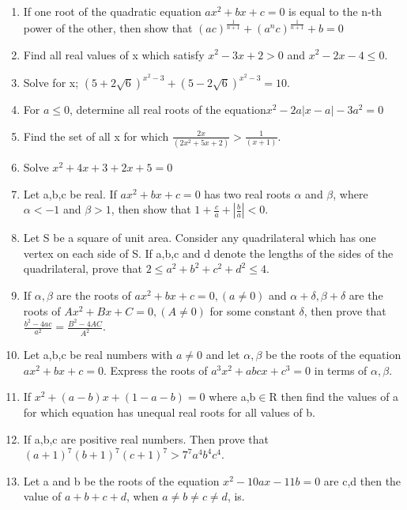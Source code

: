 \documentclass[journal,12pt,twocolumn]{IEEEtran}
\begin{document}
\begin{enumerate}[label=\arabic*]
\item If one root of the quadratic equation $ax^2+bx+c=0$ is equal to the n-th power of the other, then show that $(ac)^{\frac{1}{n+1}}+(a^nc)^{\frac{1}{n+1}}+b=0$

\item Find all real values of x which satisfy $x^2-3x+2>0$ and $x^2-2x-4\leq0$.

\item Solve for x;  $(5+2\sqrt{6})^{x^2-3}+(5-2\sqrt6)^{x^2-3}=10$.

\item For $a\leq0$, determine all real roots of the equation$x^2-2a|x-a|-3a^2=0$

\item Find the set of all x for which $\frac{2x}{(2x^2+5x+2)}>\frac{1}{(x+1)}$.

\item Solve ${x^2+4x+3}+2x+5=0$

\item Let a,b,c be real. If $ax^2+bx+c=0$ has two real roots $\alpha$ and $\beta$, where $\alpha<-1$ and $\beta>1$, then show that $1+\frac{c}{a}+|\frac{b}{a}|<0$.

\item Let S be a square of unit area. Consider any quadrilateral which has one vertex on each side of S. If a,b,c and d denote the lengths of the sides of the quadrilateral, prove that $2\leq{a}^2+b^2+c^2+d^2\leq4$.

\item If $\alpha,\beta$ are the roots of $ax^2+bx+c=0, (a\neq0)$ and $\alpha+\delta,\beta+\delta$ are the roots of $Ax^2+Bx+C=0, (A\neq0)$ for some constant $\delta$, then prove that $\frac{b^2-4ac}{a^2}=\frac{B^2-4AC}{A^2}$.

\item Let a,b,c be real numbers with $a\neq0$ and let $\alpha,\beta$ be the roots of the equation $ax^2+bx+c=0$. Express the roots of $a^3x^2+abcx+c^3=0$ in terms of $\alpha,\beta$.

\item If $x^2+(a-b)x+(1-a-b)=0$ where a,b$\in$R then find the values of a for which equation has unequal real roots for all values of b.

\item If a,b,c are positive real numbers. Then prove that $(a+1)^7(b+1)^7(c+1)^7>7^7a^4b^4c^4$.

\item Let a and b be the roots of the equation $x^2-10ax-11b=0$ are c,d then the value of $a+b+c+d$, when $a\neq{b}\neq{c}\neq{d}$, is.


\end{enumerate}
\end{document}
